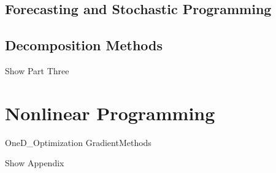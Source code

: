\documentclass[letter,12pt]{book}
\renewcommand{\0}{\mathbf{0}}
\begin{document}

%
%




\chapter{Forecasting and Stochastic Programming}
%

\chapter{Decomposition Methods}
%
\fi

\def\partThree{Show Part Three}
\ifdefined\partThree

\part{Nonlinear Programming}


%



{OneD_Optimization}
{GradientMethods}

\fi


\def\partAppendix{Show Appendix}
\ifdefined\partAppendix
\end{document}
